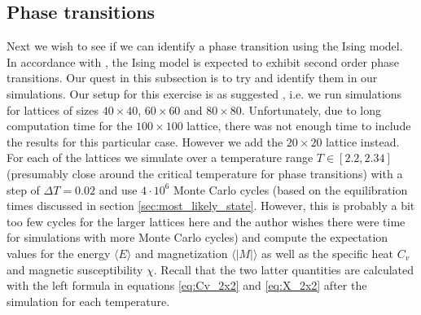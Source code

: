 \documentclass[12pt]{article}
\numberwithin{figure}{section}
\numberwithin{table}{section}
\begin{document}
\subsection{Phase transitions} \label{sec:phase_transitions}
Next we wish to see if we can identify a phase transition using the Ising model. In accordance with \cite{Comp}, the Ising model is expected to exhibit second order phase transitions. Our quest in this subsection is to try and identify them in our simulations. Our setup for this exercise is as suggested \cite{pro4}, i.e. we run simulations for lattices of sizes $40\times40$, $60\times60$ and $80\times80$. Unfortunately, due to long computation time for the $100\times100$ lattice, there was not enough time to include the results for this particular case. However we add the $20\times20$ lattice instead. For each of the lattices we simulate over a temperature range $T\in[2.2,2.34]$ (presumably close around the critical temperature for phase transitions) with a step of $\Delta T=0.02$ and use $4\cdot10^6$ Monte Carlo cycles (based on the equilibration times discussed in section \ref{sec:most_likely_state}. However, this is probably a bit too few cycles for the larger lattices here and the author wishes there were time for simulations with more Monte Carlo cycles) and compute the expectation values for the energy $\langle E \rangle$ and magnetization $\langle |M| \rangle$ as well as the specific heat $C_v$ and magnetic susceptibility $\chi$. Recall that the two latter quantities are calculated with the left formula in equations \eqref{eq:Cv_2x2} and \eqref{eq:X_2x2} after the simulation for each temperature.
\end{document}
